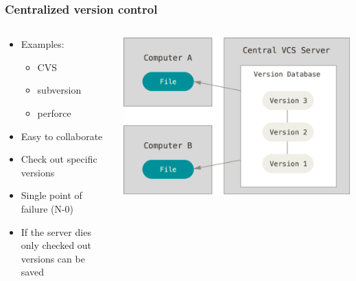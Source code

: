 \begin{frame}
	\frametitle{Centralized version control}
	\begin{columns}
		\begin{column}{0.5\textwidth}
			\begin{itemize}[<+->]
				\item Examples:
						\begin{itemize}[<+->]
							\item CVS
							\item subversion
							\item perforce
						\end{itemize}
				\item Easy to collaborate
				\item Check out specific versions
				\item Single point of failure (N-0)
				\item If the server dies only checked out versions can be saved
			\end{itemize}
		\end{column}
		\begin{column}{0.5\textwidth}
			\includegraphics[width=\textwidth]{./pictures/centralized.png}
		\end{column}
	\end{columns}
\end{frame}

